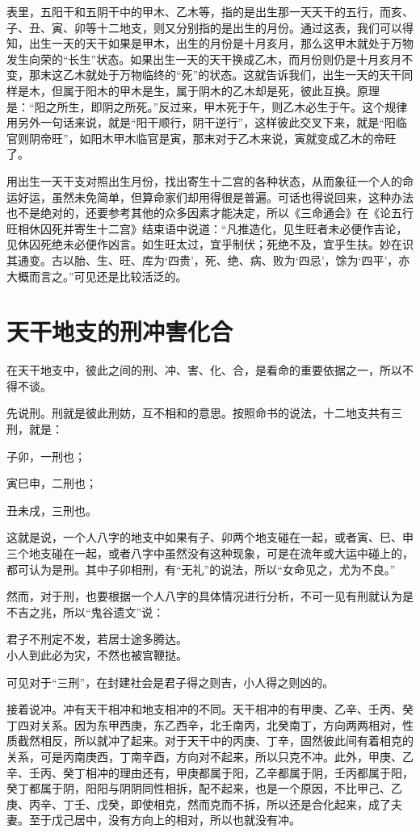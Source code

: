 \documentclass[a5paper,oneside,12pt]{ctexbook}
\newenvironment{tightcenter}{%
  \setlength\topsep{0pt}
  \setlength\parskip{0pt}
  \begin{center}\kaishu 
}{%
  \end{center}
}
\begin{document}
表里，五阳干和五阴干中的甲木、乙木等，指的是出生那一天天干的五行，而亥、子、丑、寅、卯等十二地支，则又分别指的是出生的月份。通过这表，我们可以得知，出生一天的天干如果是甲木，出生的月份是十月亥月，那么这甲木就处于万物发生向荣的“长生”状态。如果出生一天的天干换成乙木，而月份则仍是十月亥月不变，那末这乙木就处于万物临终的“死”的状态。这就告诉我们，出生一天的天干同样是木，但属于阳木的甲木是生，属于阴木的乙木却是死，彼此互换。原理是：“阳之所生，即阴之所死。”反过来，甲木死于午，则乙木必生于午。这个规律用另外一句话来说，就是“阳干顺行，阴干逆行”，这样彼此交叉下来，就是“阳临官则阴帝旺”，如阳木甲木临官是寅，那末对于乙木来说，寅就变成乙木的帝旺了。

用出生一天干支对照出生月份，找出寄生十二宫的各种状态，从而象征一个人的命运好运，虽然未免简单，但算命家们却用得很是普遍。可话也得说回来，这种办法也不是绝对的，还要参考其他的众多因素才能决定，所以《三命通会》在《论五行旺相休囚死并寄生十二宫》结束语中说道：“凡推造化，见生旺者未必便作吉论，见休囚死绝未必便作凶言。如生旺太过，宜乎制伏；死绝不及，宜乎生扶。妙在识其通变。古以胎、生、旺、库为‘四贵’，死、绝、病、败为‘四忌’，馀为‘四平’，亦大概而言之。”可见还是比较活泛的。


\section{天干地支的刑冲害化合}
在天干地支中，彼此之间的刑、冲、害、化、合，是看命的重要依据之一，所以不得不谈。

先说刑。刑就是彼此刑妨，互不相和的意思。按照命书的说法，十二地支共有三刑，就是：

子卯，一刑也；\par
寅巳申，二刑也；\par
丑未戌，三刑也。

这就是说，一个人八字的地支中如果有子、卯两个地支碰在一起，或者寅、巳、申三个地支碰在一起，或者八字中虽然没有这种现象，可是在流年或大运中碰上的，都可认为是刑。其中子卯相刑，有“无礼”的说法，所以“女命见之，尤为不良。”

然而，对于刑，也要根据一个人八字的具体情况进行分析，不可一见有刑就认为是不吉之兆，所以“鬼谷遗文”说：
\begin{tightcenter}
    君子不刑定不发，若居士途多腾达。\\
    小人到此必为灾，不然也被宫鞭挞。
\end{tightcenter}
可见对于“三刑”，在封建社会是君子得之则吉，小人得之则凶的。

接着说冲。冲有天干相冲和地支相冲的不同。天干相冲的有甲庚、乙辛、壬丙、癸丁四对关系。因为东甲西庚，东乙西辛，北壬南丙，北癸南丁，方向两两相对，性质截然相反，所以就冲了起来。对于天干中的丙庚、丁辛，固然彼此间有着相克的关系，可是丙南庚西，丁南辛酉，方向对不起来，所以只克不冲。此外，甲庚、乙辛、壬丙、癸丁相冲的理由还有，甲庚都属于阳，乙辛都属于阴，壬丙都属于阳，癸丁都属于阴，阳阳与阴阴同性相拆，配不起来，也是一个原因，不比甲己、乙庚、丙辛、丁壬、戊癸，即使相克，然而克而不拆，所以还是合化起来，成了夫妻。至于戊己居中，没有方向上的相对，所以也就没有冲。
\end{document}
